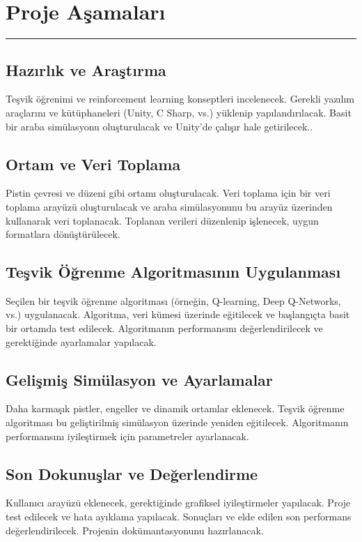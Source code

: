 \documentclass{article}
\begin{document}
\newpage

\section{Proje Aşamaları}
\rule{\textwidth}{0.5pt}

\subsection{Hazırlık ve Araştırma}
Teşvik öğrenimi ve reinforcement learning konseptleri incelenecek. Gerekli yazılım araçlarını ve kütüphaneleri (Unity, C Sharp, vs.) yüklenip yapılandırılacak. Basit bir araba simülasyonu oluşturulacak ve Unity'de çalışır hale getirilecek..\\[15pt]

\subsection{Ortam ve Veri Toplama}
Pistin çevresi ve düzeni gibi ortamı oluşturulacak. Veri toplama için bir veri toplama arayüzü oluşturulacak ve araba simülasyonunu bu arayüz üzerinden kullanarak veri toplanacak. Toplanan verileri düzenlenip işlenecek, uygun formatlara dönüştürülecek.\\[15pt]

\subsection{Teşvik Öğrenme Algoritmasının Uygulanması}
Seçilen bir teşvik öğrenme algoritması (örneğin, Q-learning, Deep Q-Networks, vs.) uygulanacak. Algoritma, veri kümesi üzerinde eğitilecek ve başlangıçta basit bir ortamda test edilecek. Algoritmanın performansını değerlendirilecek ve gerektiğinde ayarlamalar yapılacak.\\[15pt]

\subsection{Gelişmiş Simülasyon ve Ayarlamalar}
Daha karmaşık pistler, engeller ve dinamik ortamlar eklenecek. Teşvik öğrenme algoritması bu geliştirilmiş simülasyon üzerinde yeniden eğitilecek. Algoritmanın performansını iyileştirmek için parametreler ayarlanacak.\\[15pt]

\subsection{Son Dokunuşlar ve Değerlendirme}
Kullanıcı arayüzü eklenecek, gerektiğinde grafiksel iyileştirmeler yapılacak.
Proje test edilecek ve hata ayıklama yapılacak.
Sonuçları ve elde edilen son performans değerlendirilecek.
Projenin dokümantasyonunu hazırlanacak.\\[15pt]
\end{document}
